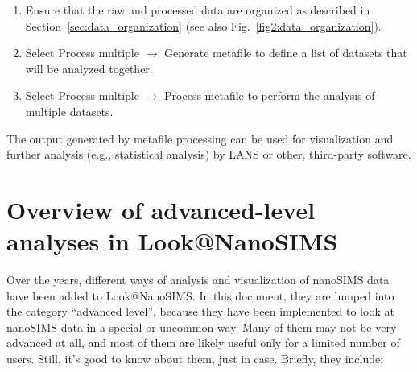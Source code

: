 \documentclass[a4paper, 11pt]{article}
\newcommand{\lans}[1]{{\color{magenta}#1}}
\newcommand\ra{\rightarrow}
\newcommand\addon[1]{-- {\small #1}}
\begin{document}
\begin{enumerate}

\item Ensure that the raw and processed data are organized as described in Section~\ref{sec:data_organization} (see also Fig.~\ref{fig2:data_organization}).

\item Select \lans{Process multiple} $\ra$ \lans{Generate metafile} to define a list of datasets that will be analyzed together.


\item Select \lans{Process multiple} $\ra$ \lans{Process metafile} to perform the analysis of multiple datasets.

\end{enumerate}
%
The output generated by metafile processing can be used for visualization and further analysis (e.g., statistical analysis) by LANS or other, third-party software.


\section{Overview of advanced-level analyses in Look@NanoSIMS}

Over the years, different ways of analysis and visualization of nanoSIMS data have been added to Look@NanoSIMS. In this document, they are lumped into the category ``advanced level'', because they have been implemented to look at nanoSIMS data in a special or uncommon way. Many of them may not be very advanced at all, and most of them are likely useful only for a limited number of users. Still, it's good to know about them, just in case. Briefly, they include:
\end{document}
